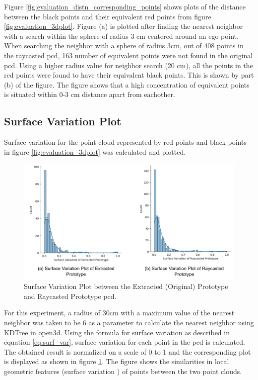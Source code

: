 Figure \ref{fig:evaluation_distn_corresponding_points} shows plots of the distance between the black points and their equivalent red points from figure \ref{fig:evaluation_3dplot}. Figure (a) is plotted after finding the nearest neighbor with a search within the sphere of radius 3 cm centered around an ego point. When searching the neighbor with a sphere of radius 3cm, out of 408 points in the raycasted \acrshort{pcd}, 163 number of equivalent points were not found in the original \acrshort{pcd}. Using a higher radius value for neighbor search (20 cm), all the points in the red points were found to have their equivalent black points. This is shown by part (b) of the figure. The figure shows that a high concentration of equivalent points is situated within 0-3 cm distance apart from eachother.

\subsection{Surface Variation Plot}
Surface variation for the point cloud represented by red points and black points in figure \ref{fig:evaluation_3dplot} was calculated and plotted.

\begin{figure}[htbp]
    \centering
    \includegraphics[width=1\linewidth]{97_graphics/evaluation/sv_plots.pdf}
    \caption{Surface Variation Plot between the Extracted (Original) Prototype and Raycasted Prototype \acrshort{pcd}.}
    \label{fig:evaluation-sv_plots}
\end{figure}

For this experiment, a radius of 30cm with a maximum value of the nearest neighbor was taken to be 6 as a parameter to calculate the nearest neighbor using KDTree in open3d. Using the formula for surface variation as described in equation \ref{eq:surf_var}, surface variation for each point in the \acrshort{pcd} is calculated. The obtained result is normalized on a scale of 0 to 1 and the corresponding plot is displayed as shown in figure \ref{fig:evaluation-sv_plots}. The figure shows the similarities in local geometric features (surface variation ) of points between the two point clouds.


